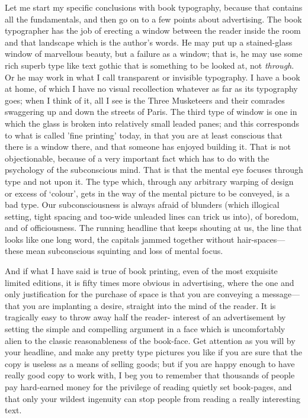 \documentclass[12pt]{article}
\begin{document}
Let me start my specific conclusions with book typography, because that contains all the fundamentals, and then go on to a few points about advertising. The book typographer has the job of erecting a window between the reader inside the room and that landscape which is the author's words. He may put up a stained-glass window of marvellous beauty, but a failure as a window; that is, he may use some rich superb type like text gothic that is something to be looked at, not \emph{through}. Or he may work in what I call transparent or invisible typography. I have a book at home, of which I have no visual recollection whatever as far as its typography goes; when I think of it, all I see is the Three Musketeers and their comrades swaggering up and down the streets of Paris. The third type of window is one in which the glass is broken into relatively small leaded panes; and this corresponds to what is called 'fine printing' today, in that you are at least conscious that there is a window there, and that someone has enjoyed building it. That is not objectionable, because of a very important fact which has to do with the psychology of the subconscious mind. That is that the mental eye focuses through type and not upon it. The type which, through any arbitrary warping of design or excess of `colour', gets in the way of the mental picture to be conveyed, is a bad type. Our subconsciousness is always afraid of blunders (which illogical setting, tight spacing and too-wide unleaded lines can trick us into), of boredom, and of officiousness. The running headline that keeps shouting at us, the line that looks like one long word, the capitals jammed together without hair-spaces---these mean subconscious squinting and loss of mental focus.

And if what I have said is true of book printing, even of the most exquisite limited editions, it is fifty times more obvious in advertising, where the one and only justification for the purchase of space is that you are conveying a message---that you are implanting a desire, straight into the mind of the reader. It is tragically easy to throw away half the reader- interest of an advertisement by setting the simple and compelling argument in a face which is uncomfortably alien to the classic reasonableness of the book-face. Get attention as you will by your headline, and make any pretty type pictures you like if you are sure that the copy is useless as a means of selling goods; but if you are happy enough to have really good copy to work with, I beg you to remember that thousands of people pay hard-earned money for the privilege of reading quietly set book-pages, and that only your wildest ingenuity can stop people from reading a really interesting text.
\end{document}
